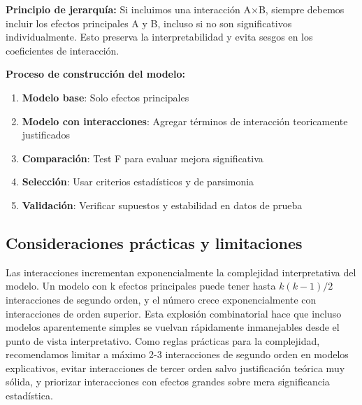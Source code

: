 \documentclass[
  letterpaper,
  DIV=11,
  numbers=noendperiod]{scrreprt}
\providecommand{\tightlist}{%
  \setlength{\itemsep}{0pt}\setlength{\parskip}{0pt}}
\begin{document}
\begin{tcolorbox}[enhanced jigsaw, breakable, toprule=.15mm, bottomtitle=1mm, coltitle=black, colbacktitle=quarto-callout-note-color!10!white, titlerule=0mm, opacitybacktitle=0.6, bottomrule=.15mm, toptitle=1mm, title=\textcolor{quarto-callout-note-color}{\faInfo}\hspace{0.5em}{Estrategia de modelado jerárquico}, arc=.35mm, rightrule=.15mm, opacityback=0, colframe=quarto-callout-note-color-frame, leftrule=.75mm, left=2mm, colback=white]

\textbf{Principio de jerarquía:} Si incluimos una interacción A×B,
siempre debemos incluir los efectos principales A y B, incluso si no son
significativos individualmente. Esto preserva la interpretabilidad y
evita sesgos en los coeficientes de interacción.

\textbf{Proceso de construcción del modelo:}

\begin{enumerate}
\def\labelenumi{\arabic{enumi}.}
\tightlist
\item
  \textbf{Modelo base}: Solo efectos principales
\item
  \textbf{Modelo con interacciones}: Agregar términos de interacción
  teoricamente justificados
\item
  \textbf{Comparación}: Test F para evaluar mejora significativa
\item
  \textbf{Selección}: Usar criterios estadísticos y de parsimonia
\item
  \textbf{Validación}: Verificar supuestos y estabilidad en datos de
  prueba
\end{enumerate}

\end{tcolorbox}

\subsection{Consideraciones prácticas y
limitaciones}\label{consideraciones-pruxe1cticas-y-limitaciones}

Las interacciones incrementan exponencialmente la complejidad
interpretativa del modelo. Un modelo con k efectos principales puede
tener hasta \(k(k-1)/2\) interacciones de segundo orden, y el número
crece exponencialmente con interacciones de orden superior. Esta
explosión combinatorial hace que incluso modelos aparentemente simples
se vuelvan rápidamente inmanejables desde el punto de vista
interpretativo. Como reglas prácticas para la complejidad, recomendamos
limitar a máximo 2-3 interacciones de segundo orden en modelos
explicativos, evitar interacciones de tercer orden salvo justificación
teórica muy sólida, y priorizar interacciones con efectos grandes sobre
mera significancia estadística.
\end{document}
